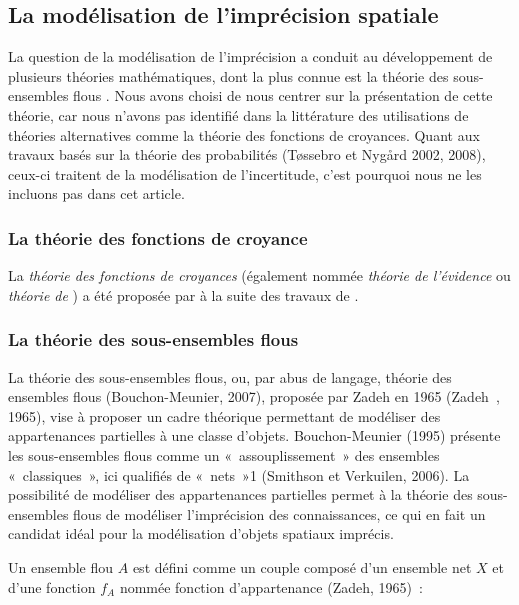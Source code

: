 \subsection{La modélisation de l'imprécision spatiale}

La question de la modélisation de l’imprécision a conduit au
développement de plusieurs théories mathématiques, dont la plus connue
est la théorie des sous-ensembles flous \autocite{Zadeh1965}. Nous
avons choisi de nous centrer sur la présentation de cette théorie, car
nous n’avons pas identifié dans la littérature des utilisations de
théories alternatives comme la théorie des fonctions de
croyances. Quant aux travaux basés sur la théorie des probabilités
(Tøssebro et Nygård 2002, 2008), ceux-ci traitent de la modélisation
de l’incertitude, c’est pourquoi nous ne les incluons pas dans cet
article.

\subsubsection{La théorie des fonctions de croyance}


La \emph{théorie des fonctions de croyances} (également nommée
\emph{théorie de l'évidence} ou \emph{théorie de
  }) a été proposée par \textcite{Shafer1976} à
la suite des travaux de \textcite{Dempster1967}.
  

\subsubsection{La théorie des sous-ensembles flous}

La théorie des sous-ensembles flous, ou, par abus de langage, théorie
des ensembles flous (Bouchon-Meunier, 2007), proposée par Zadeh en
1965 (Zadeh , 1965), vise à proposer un cadre théorique permettant de
modéliser des appartenances partielles à une classe
d’objets. Bouchon-Meunier (1995) présente les sous-ensembles flous
comme un « assouplissement » des ensembles « classiques », ici
qualifiés de « nets »1 (Smithson et Verkuilen, 2006). La possibilité
de modéliser des appartenances partielles permet à la théorie des
sous-ensembles flous de modéliser l’imprécision des connaissances, ce
qui en fait un candidat idéal pour la modélisation d’objets spatiaux
imprécis.

Un ensemble flou $A$ est défini comme un couple composé d’un ensemble
net $X$ et d’une fonction $f_A$ nommée fonction d’appartenance (Zadeh,
1965) :

